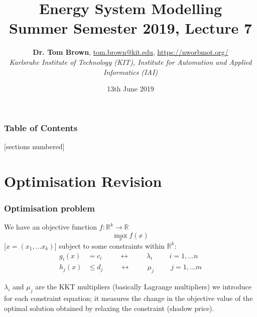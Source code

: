 \documentclass[10pt,dvipsnames]{beamer}
\title{Energy System Modelling\\ Summer Semester 2019, Lecture 7}
\author{
  {\bf Dr. Tom Brown}, \href{mailto:tom.brown@kit.edu}{tom.brown@kit.edu}, \url{https://nworbmot.org/}\\
  \emph{Karlsruhe Institute of Technology (KIT), Institute for Automation and Applied Informatics (IAI)}
}
\date{\vspace{.3cm}13th June 2019}
\newcommand{\R}{\mathbb{R}}
\def\l{\lambda}
\def\m{\mu}
\begin{document}
\maketitle


\begin{frame}

  \frametitle{Table of Contents}
  [sections numbered]
  \tableofcontents[hideallsubsections]
\end{frame}


\section{Optimisation Revision}

\begin{frame}
  \frametitle{Optimisation problem}


We have an \alert{objective function} $f: \R^k \to \R$
\begin{equation*}
  \max_{x} f(x)
\end{equation*}
[$x = (x_1, \dots x_k)$] subject to some \alert{constraints} within $\R^k$:
\begin{align*}
  g_i(x) & = c_i \hspace{1cm}\leftrightarrow\hspace{1cm} \l_i \hspace{1cm} i = 1,\dots n \\
  h_j(x) & \leq d_j \hspace{1cm}\leftrightarrow\hspace{1cm} \m_j \hspace{1cm} j = 1,\dots m
\end{align*}

$\l_i$ and $\m_j$ are the \alert{KKT multipliers} (basically Lagrange multipliers) we introduce for
each constraint equation; it measures the change in the objective value of the optimal solution obtained by relaxing the constraint (shadow price).

\end{frame}
\end{document}
